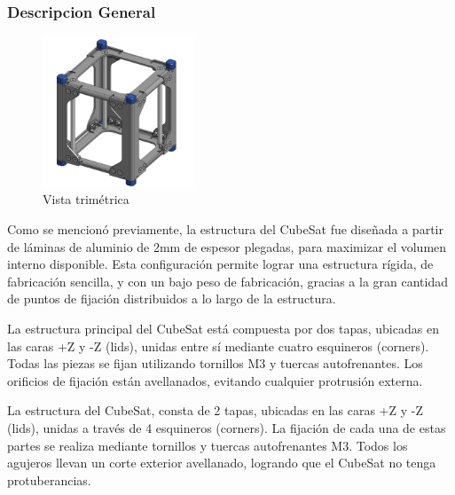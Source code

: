     \subsubsection{Descripcion General}

      \begin{figure}
        \centering
        \includegraphics[width=0.4\textwidth]{image/structure/partes.png}
        \caption{Vista trimétrica}
        \label{fig:trimetrica}
      \end{figure}
      Como se mencionó previamente, la estructura del CubeSat fue diseñada a partir de láminas de aluminio
      de 2mm de espesor plegadas, para maximizar el volumen interno disponible. Esta configuración permite
      lograr una estructura rígida, de fabricación sencilla, y con un bajo peso de fabricación, gracias a
      la gran cantidad de puntos de fijación distribuidos a lo largo de la estructura.

      La estructura principal del CubeSat está compuesta por dos tapas, ubicadas en las caras +Z y -Z
      (lids), unidas entre sí mediante cuatro esquineros (corners). Todas las piezas se fijan utilizando
      tornillos M3 y tuercas autofrenantes. Los orificios de fijación están avellanados, evitando cualquier
      protrusión externa.

      La estructura del CubeSat, consta de 2 tapas, ubicadas en las caras +Z y -Z (lids), unidas a través
      de 4 esquineros (corners). La fijación de cada una de estas partes se realiza mediante tornillos y
      tuercas autofrenantes M3. Todos los agujeros llevan un corte exterior avellanado, logrando que el
      CubeSat no tenga protuberancias.

